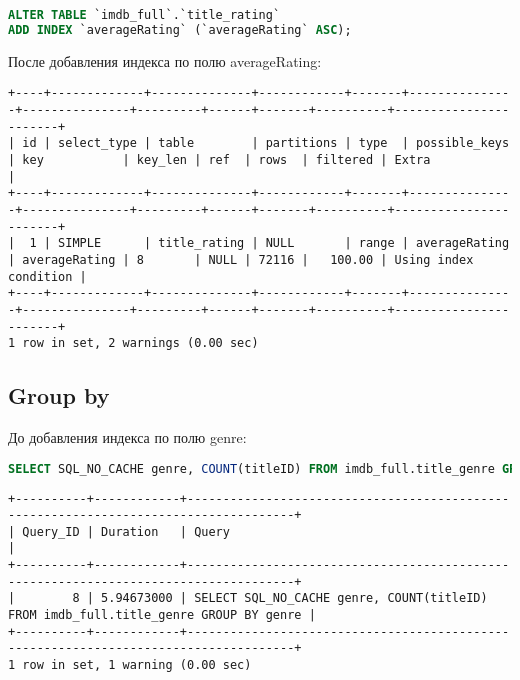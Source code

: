 \documentclass[12pt,a4paper]{article}
\begin{document}
\begin{lstlisting}[language=SQL]
ALTER TABLE `imdb_full`.`title_rating` 
ADD INDEX `averageRating` (`averageRating` ASC);
\end{lstlisting}

После добавления индекса по полю averageRating:

\begin{lstlisting}[basicstyle = \tiny\ttfamily, columns = fixed]
+----+-------------+--------------+------------+-------+---------------+---------------+---------+------+-------+----------+-----------------------+
| id | select_type | table        | partitions | type  | possible_keys | key           | key_len | ref  | rows  | filtered | Extra                 |
+----+-------------+--------------+------------+-------+---------------+---------------+---------+------+-------+----------+-----------------------+
|  1 | SIMPLE      | title_rating | NULL       | range | averageRating | averageRating | 8       | NULL | 72116 |   100.00 | Using index condition |
+----+-------------+--------------+------------+-------+---------------+---------------+---------+------+-------+----------+-----------------------+
1 row in set, 2 warnings (0.00 sec)
\end{lstlisting}

\subsection{Group by}

До добавления индекса по полю genre:

\begin{lstlisting}[language=SQL]
SELECT SQL_NO_CACHE genre, COUNT(titleID) FROM imdb_full.title_genre GROUP BY genre
\end{lstlisting}

\begin{lstlisting}[basicstyle = \tiny\ttfamily, columns = fixed]
+----------+------------+-------------------------------------------------------------------------------------+
| Query_ID | Duration   | Query                                                                               |
+----------+------------+-------------------------------------------------------------------------------------+
|        8 | 5.94673000 | SELECT SQL_NO_CACHE genre, COUNT(titleID) FROM imdb_full.title_genre GROUP BY genre |
+----------+------------+-------------------------------------------------------------------------------------+
1 row in set, 1 warning (0.00 sec)
\end{lstlisting}
\end{document}
